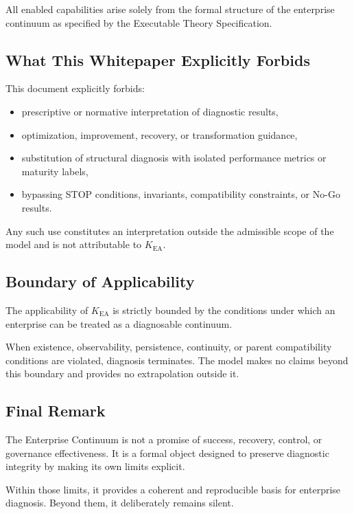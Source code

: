 All enabled capabilities arise solely from the formal structure of the
enterprise continuum as specified by the Executable Theory Specification.

\subsection{What This Whitepaper Explicitly Forbids}

This document explicitly forbids:
\begin{itemize}
  \item prescriptive or normative interpretation of diagnostic results,
  \item optimization, improvement, recovery, or transformation guidance,
  \item substitution of structural diagnosis with isolated performance
        metrics or maturity labels,
  \item bypassing STOP conditions, invariants, compatibility constraints,
        or No-Go results.
\end{itemize}

Any such use constitutes an interpretation outside the admissible scope
of the model and is not attributable to $K_{\mathrm{EA}}$.

\subsection{Boundary of Applicability}

The applicability of $K_{\mathrm{EA}}$ is strictly bounded by the
conditions under which an enterprise can be treated as a diagnosable
continuum.

When existence, observability, persistence, continuity, or parent
compatibility conditions are violated, diagnosis terminates.
The model makes no claims beyond this boundary and provides no
extrapolation outside it.

\subsection{Final Remark}

The Enterprise Continuum is not a promise of success, recovery, control,
or governance effectiveness.
It is a formal object designed to preserve diagnostic integrity by
making its own limits explicit.

Within those limits, it provides a coherent and reproducible basis for
enterprise diagnosis.
Beyond them, it deliberately remains silent.


